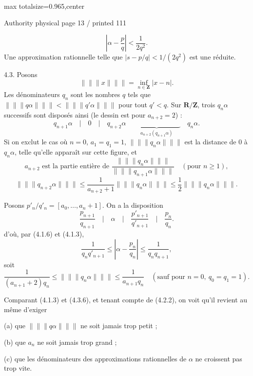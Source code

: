 \documentclass{article}
\begin{document}
\newpage
\noindent\begin{adjustbox}{max totalsize={\textwidth}{0.965\textheight},center}\begin{minipage}{\textwidth}
\noindent\hfill\scriptsize Authority physical page 13 / printed 111\par\normalsize
\[
\left|\alpha-\frac pq\right|<\frac1{2q^2}.
\]
Une approximation rationnelle telle que \(\left|s-p/q\right|<1/(2q^2)\) est une réduite.

4.3. Posons
\[
\lVert\!\lVert\!\lVert x\rVert\!\rVert\!\rVert=\inf_{n\in\mathbf Z}|x-n|.
\]
Les dénominateurs \(q_n\) sont les nombres \(q\) tels que \(\lVert\!\lVert\!\lVert q\alpha\rVert\!\rVert\!\rVert<\lVert\!\lVert\!\lVert q'\alpha\rVert\!\rVert\!\rVert\) pour tout \(q'<q\). Sur \(\mathbf R/\mathbf Z\), trois \(q_n\alpha\) successifs sont disposés ainsi (le dessin est pour \(a_{n+2}=2\)) :
\[
\tag{4.3.1}
q_{n+1}\alpha\quad\big|\quad 0\quad\big|\quad q_{n+2}\alpha
\quad\underbrace{\hspace{7em}}_{a_{n+2}(q_{n+1}\alpha)}\quad q_n\alpha.
\]
Si on exclut le cas où \(n=0\), \(a_1=q_1=1\), \(\lVert\!\lVert\!\lVert q_n\alpha\rVert\!\rVert\!\rVert\) est la distance de \(0\) à \(q_n\alpha\), telle qu’elle apparaît sur cette figure, et
\[
\tag{4.3.2}
a_{n+2}\text{ est la partie entière de }
\frac{\lVert\!\lVert\!\lVert q_n\alpha\rVert\!\rVert\!\rVert}{\lVert\!\lVert\!\lVert q_{n+1}\alpha\rVert\!\rVert\!\rVert}
\quad(\text{pour }n\geq1),
\]
\[
\tag{4.3.3}
\lVert\!\lVert\!\lVert q_{n+2}\alpha\rVert\!\rVert\!\rVert
\leq\frac1{a_{n+2}+1}\lVert\!\lVert\!\lVert q_n\alpha\rVert\!\rVert\!\rVert
\leq\frac12\lVert\!\lVert\!\lVert q_n\alpha\rVert\!\rVert\!\rVert.
\]

Posons \(p'_n/q'_n=[a_0,\ldots,a_n+1]\). On a la disposition
\[
\tag{4.3.4}
\frac{p_{n+1}}{q_{n+1}}\quad\big|\quad\alpha\quad\big|\quad
\frac{p'_{n+1}}{q'_{n+1}}\quad\big|\quad\frac{p_n}{q_n}.
\]
d’où, par (4.1.6) et (4.1.3),
\[
\tag{4.3.5}
\frac1{q_nq'_{n+1}}\leq\left|\alpha-\frac{p_n}{q_n}\right|
\leq\frac1{q_nq_{n+1}},
\]
soit
\[
\tag{4.3.6}
\frac1{(a_{n+1}+2)q_n}\leq
\lVert\!\lVert\!\lVert q_n\alpha\rVert\!\rVert\!\rVert
\leq\frac1{a_{n+1}q_n}
\quad(\text{sauf pour }n=0,\ q_0=q_1=1).
\]

Comparant (4.1.3) et (4.3.6), et tenant compte de (4.2.2), on voit qu’il revient au même d’exiger

(a) que \(\lVert\!\lVert\!\lVert q\alpha\rVert\!\rVert\!\rVert\) ne soit jamais trop petit ;

(b) que \(a_n\) ne soit jamais trop grand ;

(c) que les dénominateurs des approximations rationnelles de \(\alpha\) ne croissent pas trop vite.
\end{minipage}\end{adjustbox}
\end{document}
